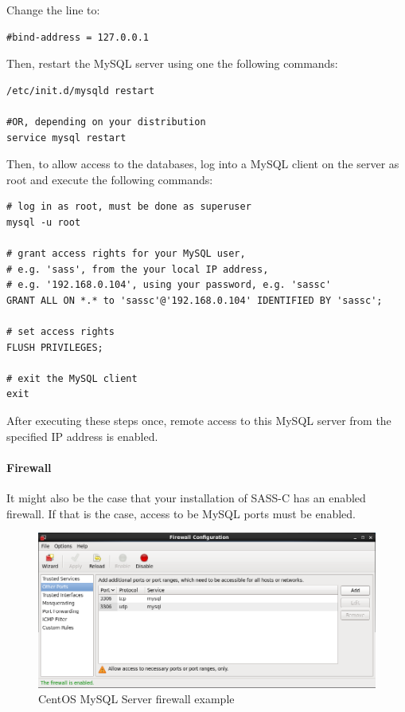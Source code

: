 Change the line to:

\begin{lstlisting}
#bind-address = 127.0.0.1
\end{lstlisting}

Then, restart the MySQL server using one the following commands:

\begin{lstlisting}
/etc/init.d/mysqld restart

#OR, depending on your distribution
service mysql restart
\end{lstlisting}

Then, to allow access to the databases, log into a MySQL client on the server as root and execute the following commands:

\begin{lstlisting}
# log in as root, must be done as superuser
mysql -u root

# grant access rights for your MySQL user, 
# e.g. 'sass', from the your local IP address, 
# e.g. '192.168.0.104', using your password, e.g. 'sassc'
GRANT ALL ON *.* to 'sassc'@'192.168.0.104' IDENTIFIED BY 'sassc';

# set access rights
FLUSH PRIVILEGES;

# exit the MySQL client
exit
\end{lstlisting}

After executing these steps once, remote access to this MySQL server from the specified IP address is enabled.

\paragraph{Firewall}

It might also be the case that your installation of SASS-C has an enabled firewall. If that is the case, access to be MySQL ports must be enabled.

\begin{figure}[H]
  \center
    \includegraphics[width=15cm,frame]{../screenshots/centos_firewall.png}
  \caption{CentOS MySQL Server firewall example}
\end{figure}

